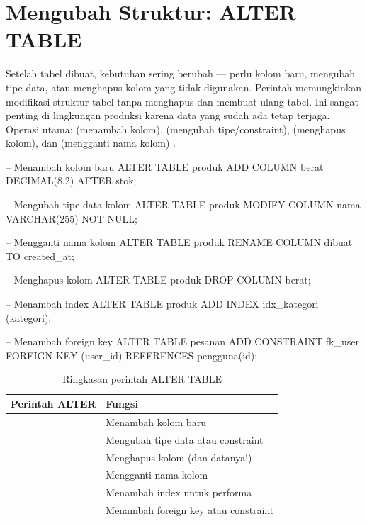﻿\section{Mengubah Struktur: ALTER TABLE}

Setelah tabel dibuat, kebutuhan sering berubah --- perlu kolom baru, mengubah tipe data, atau menghapus kolom yang tidak digunakan. Perintah  memungkinkan modifikasi struktur tabel tanpa menghapus dan membuat ulang tabel. Ini sangat penting di lingkungan produksi karena data yang sudah ada tetap terjaga. Operasi utama:  (menambah kolom),  (mengubah tipe/constraint),  (menghapus kolom), dan  (mengganti nama kolom) \cite{mysqlDocs}.

\begin{webcode}[language=SQL, caption={Contoh penggunaan ALTER TABLE}]
-- Menambah kolom baru
ALTER TABLE produk ADD COLUMN berat DECIMAL(8,2) AFTER stok;

-- Mengubah tipe data kolom
ALTER TABLE produk MODIFY COLUMN nama VARCHAR(255) NOT NULL;

-- Mengganti nama kolom
ALTER TABLE produk RENAME COLUMN dibuat TO created_at;

-- Menghapus kolom
ALTER TABLE produk DROP COLUMN berat;

-- Menambah index
ALTER TABLE produk ADD INDEX idx_kategori (kategori);

-- Menambah foreign key
ALTER TABLE pesanan ADD CONSTRAINT fk_user
  FOREIGN KEY (user_id) REFERENCES pengguna(id);
\end{webcode}

\begin{table}[H]
\centering
\begin{tabular}{|P{4cm}|P{8.5cm}|}
\hline
\textbf{Perintah ALTER} & \textbf{Fungsi} \\
\hline
{} & Menambah kolom baru \\
\hline
{} & Mengubah tipe data atau constraint \\
\hline
{} & Menghapus kolom (dan datanya!) \\
\hline
{} & Mengganti nama kolom \\
\hline
{} & Menambah index untuk performa \\
\hline
{} & Menambah foreign key atau constraint \\
\hline
\end{tabular}
\caption{Ringkasan perintah ALTER TABLE}
\end{table}

